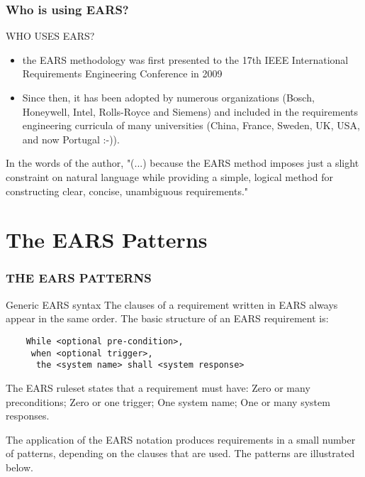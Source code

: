 \documentclass[aspectratio=169]{beamer}
\begin{document}
\begin{frame}
  \frametitle{Who is using EARS?}
  \begin{block}{WHO USES EARS?}
  \begin{itemize}
    \item the EARS methodology was first presented to the 17th IEEE International Requirements Engineering Conference in 2009
    \item Since then, it has been adopted by numerous organizations (Bosch, Honeywell, Intel, Rolls-Royce and Siemens) and included in the requirements engineering curricula of many universities (China, France, Sweden, UK, USA, and now Portugal :-)).  
  \end{itemize}
  In the words of the author, "(...) because the EARS method imposes just a slight constraint on natural language while providing a simple, logical method for constructing clear, concise, unambiguous requirements."
  \end{block} 
\end{frame}

\section*{The EARS Patterns}

\begin{frame}[fragile]
  \frametitle{THE EARS PATTERNS}
  \begin{block}{Generic EARS syntax}
    The clauses of a requirement written in EARS always appear in the same order. The basic structure of an EARS requirement is:
    \begin{verbatim}
    While <optional pre-condition>, 
     when <optional trigger>, 
      the <system name> shall <system response>  
    \end{verbatim}
  The EARS ruleset states that a requirement must have: Zero or many preconditions; Zero or one trigger; One system name; One or many system responses.

The application of the EARS notation produces requirements in a small number of patterns, depending on the clauses that are used. The patterns are illustrated below.
  \end{block}
  

\end{frame}
\end{document}
